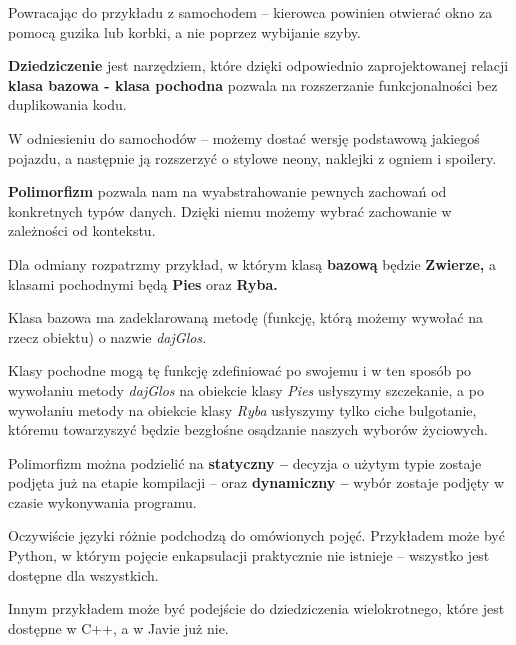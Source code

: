 Powracając do przykładu z samochodem -- kierowca powinien otwierać okno za pomocą guzika lub korbki, a nie poprzez wybijanie szyby.

\textbf{Dziedziczenie} jest narzędziem, które dzięki odpowiednio zaprojektowanej relacji \textbf{klasa bazowa - klasa pochodna} pozwala na rozszerzanie funkcjonalności bez duplikowania kodu.

W odniesieniu do samochodów -- możemy dostać wersję podstawową jakiegoś pojazdu, a następnie ją rozszerzyć o stylowe neony, naklejki z ogniem i spoilery.

\textbf{Polimorfizm} pozwala nam na wyabstrahowanie pewnych zachowań od konkretnych typów danych. Dzięki niemu możemy wybrać zachowanie w zależności od kontekstu.

Dla odmiany rozpatrzmy przykład, w którym klasą \textbf{bazową} będzie \textbf{Zwierze,} a klasami pochodnymi będą \textbf{Pies} oraz \textbf{Ryba.}

Klasa bazowa ma zadeklarowaną metodę (funkcję, którą możemy wywołać na rzecz obiektu) o nazwie \textit{dajGlos.}

Klasy pochodne mogą tę funkcję zdefiniować po swojemu i w ten sposób po wywołaniu metody \textit{dajGlos} na obiekcie klasy \textit{Pies} usłyszymy szczekanie, a po wywołaniu metody na obiekcie klasy \textit{Ryba} usłyszymy tylko ciche bulgotanie, któremu towarzyszyć będzie bezgłośne osądzanie naszych wyborów życiowych.

Polimorfizm można podzielić na \textbf{statyczny --} decyzja o użytym typie zostaje podjęta już na etapie kompilacji -- oraz \textbf{dynamiczny --} wybór zostaje podjęty w czasie wykonywania programu.

Oczywiście języki różnie podchodzą do omówionych pojęć.
Przykładem może być Python, w którym pojęcie enkapsulacji praktycznie nie istnieje -- wszystko jest dostępne dla wszystkich.

Innym przykładem może być podejście do dziedziczenia wielokrotnego, które jest dostępne w C++, a w Javie już nie.

